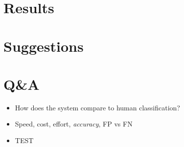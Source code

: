 \documentclass{beamer}
\begin{document}
\section{Results}
\section{Suggestions}
\section{Q\&A}


\begin{frame}
\end{frame}


\begin{frame}
  \begin{itemize}
	    \item How does the system compare to human classification?
	    \item Speed, cost, effort, \emph{accuracy}, FP vs FN
	    \item TEST
  \end{itemize}
\end{frame}
\end{document}
